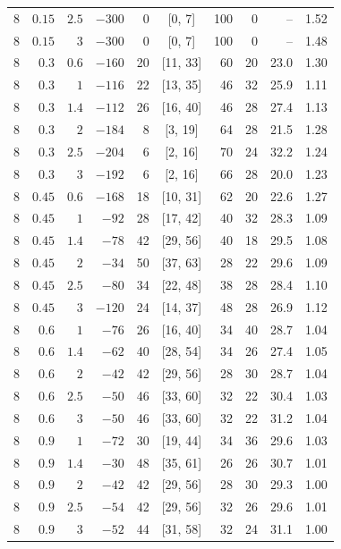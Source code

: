\begin{table}[t]
\begin{tabular}{rrrrrcrrrr}
$8$ & $0.15$ & $2.5$ & $-300$ & 0 & [0, 7] & 100 & 0 & -- & 1.52 \\
$8$ & $0.15$ & $3$ & $-300$ & 0 & [0, 7] & 100 & 0 & -- & 1.48 \\
$8$ & $0.3$ & $0.6$ & $-160$ & 20 & [11, 33] & 60 & 20 & 23.0 & 1.30 \\
$8$ & $0.3$ & $1$ & $-116$ & 22 & [13, 35] & 46 & 32 & 25.9 & 1.11 \\
$8$ & $0.3$ & $1.4$ & $-112$ & 26 & [16, 40] & 46 & 28 & 27.4 & 1.13 \\
$8$ & $0.3$ & $2$ & $-184$ & 8 & [3, 19] & 64 & 28 & 21.5 & 1.28 \\
$8$ & $0.3$ & $2.5$ & $-204$ & 6 & [2, 16] & 70 & 24 & 32.2 & 1.24 \\
$8$ & $0.3$ & $3$ & $-192$ & 6 & [2, 16] & 66 & 28 & 20.0 & 1.23 \\
$8$ & $0.45$ & $0.6$ & $-168$ & 18 & [10, 31] & 62 & 20 & 22.6 & 1.27 \\
$8$ & $0.45$ & $1$ & $-92$ & 28 & [17, 42] & 40 & 32 & 28.3 & 1.09 \\
$8$ & $0.45$ & $1.4$ & $-78$ & 42 & [29, 56] & 40 & 18 & 29.5 & 1.08 \\
$8$ & $0.45$ & $2$ & $-34$ & 50 & [37, 63] & 28 & 22 & 29.6 & 1.09 \\
$8$ & $0.45$ & $2.5$ & $-80$ & 34 & [22, 48] & 38 & 28 & 28.4 & 1.10 \\
$8$ & $0.45$ & $3$ & $-120$ & 24 & [14, 37] & 48 & 28 & 26.9 & 1.12 \\
$8$ & $0.6$ & $1$ & $-76$ & 26 & [16, 40] & 34 & 40 & 28.7 & 1.04 \\
$8$ & $0.6$ & $1.4$ & $-62$ & 40 & [28, 54] & 34 & 26 & 27.4 & 1.05 \\
$8$ & $0.6$ & $2$ & $-42$ & 42 & [29, 56] & 28 & 30 & 28.7 & 1.04 \\
$8$ & $0.6$ & $2.5$ & $-50$ & 46 & [33, 60] & 32 & 22 & 30.4 & 1.03 \\
$8$ & $0.6$ & $3$ & $-50$ & 46 & [33, 60] & 32 & 22 & 31.2 & 1.04 \\
$8$ & $0.9$ & $1$ & $-72$ & 30 & [19, 44] & 34 & 36 & 29.6 & 1.03 \\
$8$ & $0.9$ & $1.4$ & $-30$ & 48 & [35, 61] & 26 & 26 & 30.7 & 1.01 \\
$8$ & $0.9$ & $2$ & $-42$ & 42 & [29, 56] & 28 & 30 & 29.3 & 1.00 \\
$8$ & $0.9$ & $2.5$ & $-54$ & 42 & [29, 56] & 32 & 26 & 29.6 & 1.01 \\
$8$ & $0.9$ & $3$ & $-52$ & 44 & [31, 58] & 32 & 24 & 31.1 & 1.00 \\

\end{tabular}
\end{table}
